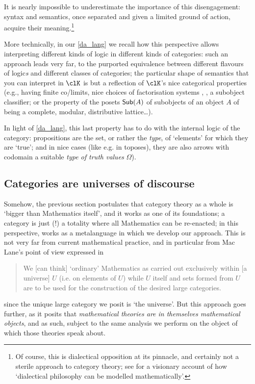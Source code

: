 It is nearly impossible to underestimate the importance of this disengagement: syntax and semantics, once separated and given a limited ground of action, acquire their meaning.\footnote{Of course, this is dialectical opposition at its pinnacle, and certainly not a sterile approach to category theory; see \cite{lawvere1996unity} for a visionary account of how `dialectical philosophy can be modelled mathematically'.}

More technically, in our \autoref{da_lang} we recall how this perspective allows interpreting different kinds of logic in different kinds of categories: such an approach leads very far, to the purported equivalence between different flavours of logic\emph{s} and different classes of categories; the particular shape of semantics that you can interpret in $\clK$ is but a reflection of $\clK$'s nice categorical properties (e.g., having finite co/limits, nice choices of factorisation systems \cite[5.5]{Bor1}, \cite{FK}, a subobject classifier; or the property of the posets $\mathsf{Sub}(A)$ of subobjects of an object $A$ of being a complete, modular, distributive lattice\dots).

In light of \autoref{da_lang}, this last property has to do with the internal logic of the category: propositions are the set, or rather the \emph{type}, of `elements' for which they are `true'; and in nice cases (like e.g. in toposes), they are also arrows with codomain a suitable \emph{type of truth values} $\Omega$).
\subsection{Categories are universes of discourse}\label{are_universes}
Somehow, the previous section postulates that category theory as a whole is `bigger than Mathematics itself', and it works as one of its foundations; a category is just (!) a totality where all Mathematics can be re-enacted; in this perspective,  works as a metalanguage in which we develop our approach. This is not very far from current mathematical practice, and in particular from Mac Lane's point of view expressed in
\begin{quote}
    We [can think] `ordinary' Mathematics as carried out exclusively within [a universe] $U$ (i.e. on elements of $U$) while $U$ itself and sets formed from $U$ are to be used for the construction of the desired large categories.\hfill \cite[I.6]{McL}
\end{quote}
since the unique large category we posit is `the universe'. But this approach goes further, as it posits that \emph{mathematical theories are in themselves mathematical objects}, and as such, subject to the same analysis we perform on the object of which those theories speak about.

